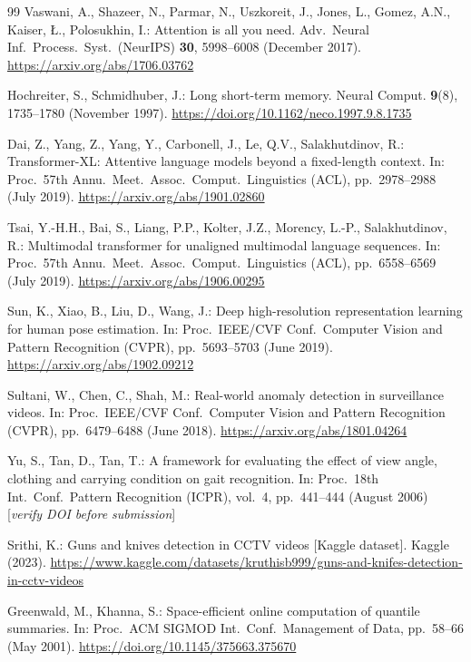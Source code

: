 \documentclass[runningheads]{llncs}
\begin{document}
\begin{thebibliography}{99}
Vaswani, A., Shazeer, N., Parmar, N., Uszkoreit, J., Jones, L., Gomez, A.N., Kaiser, \L., Polosukhin, I.: Attention is all you need. Adv.\ Neural Inf.\ Process.\ Syst.\ (NeurIPS) \textbf{30}, 5998--6008 (December 2017). \url{https://arxiv.org/abs/1706.03762}

Hochreiter, S., Schmidhuber, J.: Long short-term memory. Neural Comput. \textbf{9}(8), 1735--1780 (November 1997). \url{https://doi.org/10.1162/neco.1997.9.8.1735}

Dai, Z., Yang, Z., Yang, Y., Carbonell, J., Le, Q.V., Salakhutdinov, R.: Transformer-XL: Attentive language models beyond a fixed-length context. In: Proc.\ 57th Annu.\ Meet.\ Assoc.\ Comput.\ Linguistics (ACL), pp.\ 2978--2988 (July 2019). \url{https://arxiv.org/abs/1901.02860}

Tsai, Y.-H.H., Bai, S., Liang, P.P., Kolter, J.Z., Morency, L.-P., Salakhutdinov, R.: Multimodal transformer for unaligned multimodal language sequences. In: Proc.\ 57th Annu.\ Meet.\ Assoc.\ Comput.\ Linguistics (ACL), pp.\ 6558--6569 (July 2019). \url{https://arxiv.org/abs/1906.00295}

Sun, K., Xiao, B., Liu, D., Wang, J.: Deep high-resolution representation learning for human pose estimation. In: Proc.\ IEEE/CVF Conf.\ Computer Vision and Pattern Recognition (CVPR), pp.\ 5693--5703 (June 2019). \url{https://arxiv.org/abs/1902.09212}

Sultani, W., Chen, C., Shah, M.: Real-world anomaly detection in surveillance videos. In: Proc.\ IEEE/CVF Conf.\ Computer Vision and Pattern Recognition (CVPR), pp.\ 6479--6488 (June 2018). \url{https://arxiv.org/abs/1801.04264}

Yu, S., Tan, D., Tan, T.: A framework for evaluating the effect of view angle, clothing and carrying condition on gait recognition. In: Proc.\ 18th Int.\ Conf.\ Pattern Recognition (ICPR), vol.\ 4, pp.\ 441--444 (August 2006) [\textit{verify DOI before submission}]

Srithi, K.: Guns and knives detection in CCTV videos [Kaggle dataset]. Kaggle (2023). \url{https://www.kaggle.com/datasets/kruthisb999/guns-and-knifes-detection-in-cctv-videos}

Greenwald, M., Khanna, S.: Space-efficient online computation of quantile summaries. In: Proc.\ ACM SIGMOD Int.\ Conf.\ Management of Data, pp.\ 58--66 (May 2001). \url{https://doi.org/10.1145/375663.375670}


\end{thebibliography}
\end{document}
